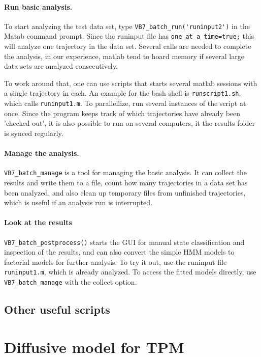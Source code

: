 \documentclass[11pt,letterpaper,twocolumn]{article}
\begin{document}
\paragraph{Run basic analysis.}
To start analyzing the test data set, type
\verb+VB7_batch_run('runinput2')+ in the Matab command prompt. Since
the runinput file has \verb+one_at_a_time=true;+ this will analyze one
trajectory in the data set. Several calls are needed to complete the
analysis, in our experience, matlab tend to hoard
memory if several large data sets are analyzed consecutively. 

To work around that, one can use scripts that starts several matlab
sessions with a single trajectory in each. An example for the bash
shell is \verb+runscript1.sh+, which calls \verb+runinput1.m+. To
parallellize, run several instances of the script at once. Since the
program keeps track of which trajectories have already been 'checked
out', it is also possible to run on several computers, it the results
folder is synced regularly.

\paragraph{Manage the analysis.}
\verb+VB7_batch_manage+ is a tool for managing the basic analysis. It
can collect the results and write them to a file, count how many
trajectories in a data set has been analyzed, and also clean up
temporary files from unfinished trajectories, which is useful if an
analysis run is interrupted.

\paragraph{Look at the results\\}
\verb+VB7_batch_postprocess()+ starts the GUI for manual state
classification and inspection of the results, and can also convert the
simple HMM models to factorial models for further analysis. To try it
out, use the runinput file \verb+runinput1.m+, which is already
analyzed. To access the fitted models directly, use
\verb+VB7_batch_manage+ with the collect option. 

\subsection{Other useful scripts}


\section{Diffusive model for TPM}

\end{document}
